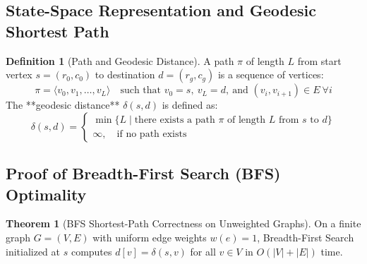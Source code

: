 \documentclass[11pt,a4paper]{article}
\theoremstyle{definition}
\newtheorem{theorem}{Theorem}
\newtheorem{definition}{Definition}
\begin{document}
\subsection{State-Space Representation and Geodesic Shortest Path}
\begin{definition}[Path and Geodesic Distance]
A path $\pi$ of length $L$ from start vertex $s = (r_0, c_0)$ to destination $d = (r_g, c_g)$ is a sequence of vertices:
$$\pi = \langle v_0, v_1, \dots, v_L \rangle \quad \text{such that } v_0 = s, \ v_L = d, \ \text{and } (v_i, v_{i+1}) \in E \ \forall i$$
The **geodesic distance** $\delta(s, d)$ is defined as:
$$\delta(s, d) = \begin{cases} \min \{L \mid \text{there exists a path } \pi \text{ of length } L \text{ from } s \text{ to } d\} \\ \infty, \quad \text{if no path exists} \end{cases}$$
\end{definition}

\subsection{Proof of Breadth-First Search (BFS) Optimality}
\begin{theorem}[BFS Shortest-Path Correctness on Unweighted Graphs]
On a finite graph $G = (V, E)$ with uniform edge weights $w(e) = 1$, Breadth-First Search initialized at $s$ computes $d[v] = \delta(s, v)$ for all $v \in V$ in $O(|V| + |E|)$ time.
\end{theorem}
\end{document}
